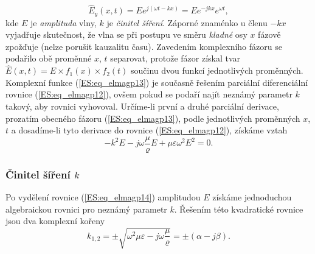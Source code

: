 {      \begin{equation}\label{ES:eq_elmagp13}
        \hat{E}_y(x,t) = Ee^{j(\omega t - kx)} = Ee^{-jkx}e^{\omega t},
      \end{equation}
      kde \(E\) je \emph{amplituda} vlny, \(k\) je \emph{činitel šíření}. Záporné znaménko u členu 
      \(-kx\) vyjadřuje skutečnost, že vlna se při postupu ve směru \emph{kladné} osy \(x\) fázově 
      zpožďuje (nelze porušit kauzalitu času). Zavedením komplexního fázoru se podařilo obě 
      proměnné \(x\), \(t\) separovat, protože fázor získal tvar \(\hat{E}(x,t) = E\times f_1(x) 
      \times f_2(t)\) součinu dvou funkcí jednotlivých proměnných. Komplexní funkce 
      (\ref{ES:eq_elmagp13}) je současně řešením parciální diferenciální rovnice 
      (\ref{ES:eq_elmagp12}), ovšem pokud se podaří najít neznámý parametr \(k\) takový, aby 
      rovnici vyhovoval. Určíme-li první a druhé parciální derivace, prozatím obecného 
      fázoru (\ref{ES:eq_elmagp13}), podle jednotlivých proměnných \(x\), \(t\) a dosadíme-li tyto 
      derivace do rovnice (\ref{ES:eq_elmagp12}), získáme vztah
      \begin{equation}\label{ES:eq_elmagp14}
        -k^2E -j\omega\frac{\mu}{\varrho}E +\mu\varepsilon\omega^2E^2 = 0.
      \end{equation}
      \subsubsection{Činitel šíření \(k\)}
        Po vydělení rovnice (\ref{ES:eq_elmagp14}) amplitudou \(E\) získáme jednoduchou 
        algebraickou rovnici pro neznámý parametr \(k\). Řešením této kvadratické rovnice jsou dva 
        komplexní kořeny
        \begin{equation}\label{ES:eq_elmagp15}
          k_{1,2} = \pm\sqrt{\omega^2\mu\varepsilon - j\omega\frac{\mu}{\varrho}}
                  =\pm(\alpha-j\beta).
        \end{equation}
}
